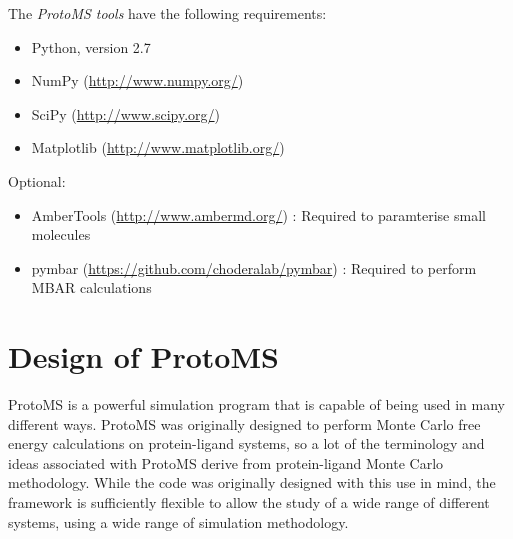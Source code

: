 \documentclass[letterpaper,10pt,english]{manual}
\begin{document}
The \emph{ProtoMS tools} have the following requirements:
\begin{itemize}
\item {} 
Python, version 2.7

\item {} 
NumPy (\href{http://www.numpy.org/}{http://www.numpy.org/})

\item {} 
SciPy (\href{http://www.scipy.org/}{http://www.scipy.org/})

\item {} 
Matplotlib (\href{http://www.matplotlib.org/}{http://www.matplotlib.org/})

\end{itemize}

Optional:
\begin{itemize}
\item {} 
AmberTools (\href{http://www.ambermd.org/}{http://www.ambermd.org/})          : Required to paramterise small molecules

\item {} 
pymbar (\href{https://github.com/choderalab/pymbar}{https://github.com/choderalab/pymbar}) : Required to perform MBAR calculations

\end{itemize}

\resetcurrentobjects
\hypertarget{--doc-protoms}{}

\chapter{Design of ProtoMS}
ProtoMS is a powerful simulation program that is capable of being used in many different ways. ProtoMS was originally designed to perform Monte Carlo free energy calculations on protein-ligand systems, so a lot of the terminology and ideas associated with ProtoMS derive from protein-ligand Monte Carlo methodology. While the code was originally designed with this use in mind, the framework is sufficiently flexible to allow the study of a wide range of different systems, using a wide range of simulation methodology.
\end{document}
